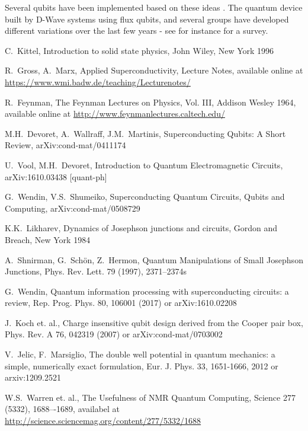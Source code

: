 \documentclass[a4paper, draft]{article}
\theoremstyle{own}
\theoremstyle{remark}
\begin{document}
Several qubits have been implemented based on these ideas . The quantum device built by D-Wave systems using flux qubits, and several groups have developed different variations over the last few years - see for instance \cite{Wendin2016} for a survey.

\begin{thebibliography}{9}


C.~Kittel, Introduction to solid state physics, John Wiley, New York 1996

R.~Gross, A.~Marx, Applied Superconductivity, Lecture Notes, available online at \url{https://www.wmi.badw.de/teaching/Lecturenotes/}

R.~Feynman,
The Feynman Lectures on Physics, Vol. III, Addison Wesley 1964, available online at \url{http://www.feynmanlectures.caltech.edu/}

M.H.~Devoret, A.~Wallraff, J.M.~Martinis,
Superconducting Qubits: A Short Review, arXiv:cond-mat/0411174 

U.~Vool, M.H.~Devoret, 
Introduction to Quantum Electromagnetic Circuits, arXiv:1610.03438 [quant-ph]

G.~Wendin, V.S.~Shumeiko,
Superconducting Quantum Circuits, Qubits and Computing,
arXiv:cond-mat/0508729

K.K.~Likharev, Dynamics of Josephson junctions and circuits,
Gordon and Breach, New York 1984

A.~Shnirman, G.~Sch\"on, Z.~Hermon,
Quantum Manipulations of Small Josephson Junctions,
Phys. Rev. Lett. 79 (1997), 2371--2374s

G.~Wendin, 
Quantum information processing with superconducting circuits: a review, Rep. Prog. Phys. 80, 106001 (2017) or arXiv:1610.02208 

J.~Koch et. al., Charge insensitive qubit design derived from the Cooper pair box, Phys. Rev. A 76, 042319 (2007) or arXiv:cond-mat/0703002

V.~Jelic, F.~Marsiglio, The double well potential in quantum mechanics: a simple, numerically exact formulation, Eur. J. Phys. 33, 1651-1666, 2012 or arxiv:1209.2521

W.S.~Warren et. al., 
The Usefulness of NMR Quantum Computing, Science 277 (5332), 1688–-1689, availabel at \url{http://science.sciencemag.org/content/277/5332/1688}

\end{thebibliography}
\end{document}
